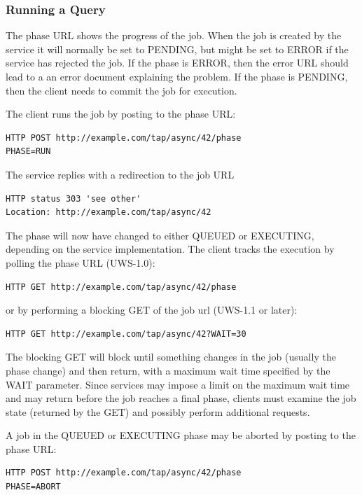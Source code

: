 \documentclass[11pt,letter]{ivoa}
\begin{document}
\subsubsection{Running a Query}
\label{sec:example-RunningQuery}
The phase URL shows the progress of the job. When the job is created by the 
service it will normally be set to PENDING, but might be set to ERROR if the 
service has rejected the job. If the phase is ERROR, then the error URL should 
lead to a an error document explaining the problem. If the phase is PENDING, 
then the client needs to commit the job for execution.

The client runs the job by posting to the phase URL:
\begin{verbatim}
HTTP POST http://example.com/tap/async/42/phase
PHASE=RUN
\end{verbatim}

The service replies with a redirection to the job URL
\begin{verbatim}
HTTP status 303 'see other'
Location: http://example.com/tap/async/42
\end{verbatim}
The phase will now have changed to either QUEUED or EXECUTING, depending on the 
service implementation. The client tracks the execution by polling the phase 
URL (UWS-1.0):
\begin{verbatim}
HTTP GET http://example.com/tap/async/42/phase
\end{verbatim}
or by performing a blocking GET of the job url (UWS-1.1 or later):
\begin{verbatim}
HTTP GET http://example.com/tap/async/42?WAIT=30
\end{verbatim}
The blocking GET will block until something changes in the job (usually the phase
change) and then return, with a maximum wait time specified by the WAIT parameter. Since
services may impose a limit on the maximum wait time and may return before the job reaches
a final phase, clients must examine the job state (returned by the GET) and possibly perform
additional requests.

A job in the  QUEUED or EXECUTING phase may be aborted by posting to the phase 
URL:
\begin{verbatim}
HTTP POST http://example.com/tap/async/42/phase
PHASE=ABORT
\end{verbatim}
\end{document}
